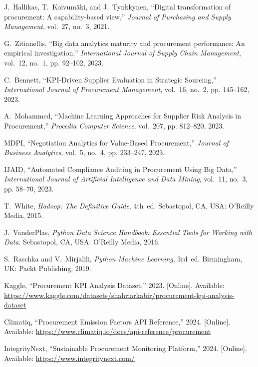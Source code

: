 \documentclass[10pt, twocolumn]{article}
\begin{document}
\begin{thebibliography}{10}

J.~Hallikas, T.~Koivumäki, and J.~Tynkkynen, ``Digital transformation of procurement: A capability-based view,'' \emph{Journal of Purchasing and Supply Management}, vol.~27, no.~3, 2021.

G.~Zitianellis, ``Big data analytics maturity and procurement performance: An empirical investigation,'' \emph{International Journal of Supply Chain Management}, vol.~12, no.~1, pp. 92--102, 2023.

C.~Bennett, ``KPI-Driven Supplier Evaluation in Strategic Sourcing,'' \emph{International Journal of Procurement Management}, vol.~16, no.~2, pp. 145--162, 2023.

A.~Mohammed, ``Machine Learning Approaches for Supplier Risk Analysis in Procurement,'' \emph{Procedia Computer Science}, vol.~207, pp. 812--820, 2023.

MDPI, ``Negotiation Analytics for Value-Based Procurement,'' \emph{Journal of Business Analytics}, vol.~5, no.~4, pp. 233--247, 2023.

IJAID, ``Automated Compliance Auditing in Procurement Using Big Data,'' \emph{International Journal of Artificial Intelligence and Data Mining}, vol.~11, no.~3, pp. 58--70, 2023.

T.~White, \emph{Hadoop: The Definitive Guide}, 4th~ed. Sebastopol, CA, USA: O’Reilly Media, 2015.

J.~VanderPlas, \emph{Python Data Science Handbook: Essential Tools for Working with Data}. Sebastopol, CA, USA: O’Reilly Media, 2016.

S.~Raschka and V.~Mirjalili, \emph{Python Machine Learning}, 3rd~ed. Birmingham, UK: Packt Publishing, 2019.

Kaggle, ``Procurement KPI Analysis Dataset,'' 2023. [Online]. Available: \url{https://www.kaggle.com/datasets/shahriarkabir/procurement-kpi-analysis-dataset}

Climatiq, ``Procurement Emission Factors API Reference,'' 2024. [Online]. Available: \url{https://www.climatiq.io/docs/api-reference/procurement}

IntegrityNext, ``Sustainable Procurement Monitoring Platform,'' 2024. [Online]. Available: \url{https://www.integritynext.com/}

\end{thebibliography}
\end{document}
